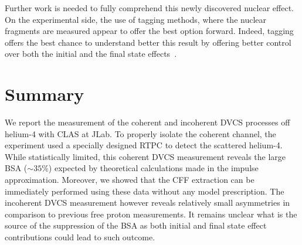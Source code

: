 \documentclass[aps,prc,preprint,superscriptaddress]{revtex4}
\begin{document}
Further work is needed to fully comprehend this newly discovered nuclear effect. On the 
experimental side, the use of tagging methods, where the nuclear fragments are measured
appear to offer the best option forward. Indeed, tagging offers the best chance to understand better
this result by offering better control over both the initial and the final state 
effects~\cite{Dupre:2015jha}.

\section{Summary}

We report the measurement of the coherent and incoherent DVCS processes off helium-4 with
CLAS at JLab. To properly isolate the coherent channel, the experiment used a specially 
designed RTPC to detect the scattered helium-4. While statistically limited, this coherent 
DVCS measurement reveals the large BSA ($\sim 35$\%) expected by theoretical calculations
made in the impulse approximation. Moreover, we showed that the CFF extraction can be 
immediately performed using these data without any model prescription. The incoherent DVCS measurement 
however reveals relatively small asymmetries in comparison to previous free proton 
measurements. It remains unclear what is the source of the suppression of the BSA as both 
initial and final state effect contributions could lead to such outcome. 


\end{document}
